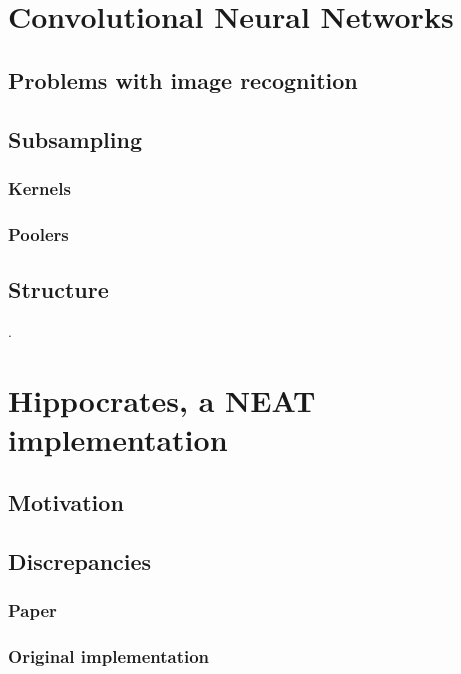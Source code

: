 \documentclass[11pt]{article}
\begin{document}
	\section{Convolutional Neural Networks}
		\subsection{Problems with image recognition}
			
		\subsection{Subsampling}
			
			\subsubsection{Kernels}
			
			\subsubsection{Poolers}
			
		\subsection{Structure}
			.
	\newpage

	\section{Hippocrates, a NEAT implementation}
		\subsection{Motivation}
			
		\subsection{Discrepancies}
			\subsubsection{Paper}
				
			\subsubsection{Original implementation}
				
\end{document}
